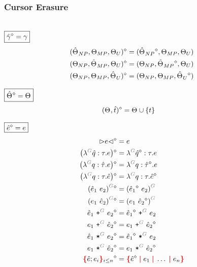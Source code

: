 
\subsubsection{Cursor Erasure}\hspace*{\fill} \\

\noindent $\boxed{\erase{\Z{\gamma}} = \gamma}$
%
\begin{align*}
  \erase{(\Z{\Set}_{NP}, \Set[MP], \Set[U])} &= (\erase{\Z{\Set}_{NP}}, \Set[MP], \Set[U]) \\
  \erase{(\Set[NP], \Z{\Set}_{MP}, \Set[U])} &= (\Set[NP], \erase{\Z{\Set}_{MP}}, \Set[U]) \\
  \erase{(\Set[NP], \Set[MP], \Z{\Set}_U)} &= (\Set[NP], \Set[MP], \erase{\Z{\Set}_U})
\end{align*}

\noindent $\boxed{\erase{\Z{\Set}} = \Set}$
%
\begin{align*}
  \erase{(\Set, \Z{t})} &= \Set \cup \SetOf{t}
\end{align*}

\noindent $\boxed{\erase{\Z{e}} = e}$
%
\begin{align*}
  \erase{\cursor{e}} &= e \\
  \erase{\left(\eFun{G}{\Z{q}}{\tau}{e}\right)} &= \eFun{G}{\erase{\Z{q}}}{\tau}{e} \\
  \erase{\left(\eFun{G}{q}{\Z{\tau}}{e}\right)} &= \eFun{G}{q}{\erase{\Z{\tau}}}{e} \\
  \erase{\left(\eFun{G}{q}{\tau}{\Z{e}}\right)} &= \eFun{G}{q}{\tau}{\erase{\Z{e}}} \\
  \erase{\eApp{G}{\Z{e}_1}{e_2}} &= \eApp{G}{\erase{\Z{e}_1}}{e_2} \\
  \erase{\eApp{G}{e_1}{\Z{e}_2}} &= \eApp{G}{e_1}{\erase{\Z{e}_2}} \\
  \erase{\ePlus{G}{\Z{e}_1}{e_2}} &= \ePlus{G}{\erase{\Z{e}_1}}{e_2} \\
  \erase{\ePlus{G}{e_1}{\Z{e}_2}} &= \ePlus{G}{e_1}{\erase{\Z{e}_2}} \\
  \erase{\eTimes{G}{\Z{e}_1}{e_2}} &= \eTimes{G}{\erase{\Z{e}_1}}{e_2} \\
  \erase{\eTimes{G}{e_1}{\Z{e}_2}} &= \eTimes{G}{e_1}{\erase{\Z{e}_2}} \\
  \erase{\conflictHoleForm{\Z{e}; e_i}{i \leq n}} &= \conflictHole{\erase{\Z{e}}, e_1, \ldots, e_n}
\end{align*}

